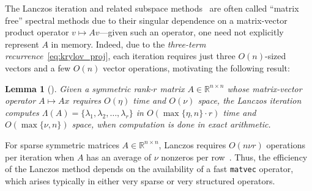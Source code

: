 \documentclass[10pt]{article}
\numberwithin{equation}{section}
\newcommand{\+}{%
	\raisebox{0.18ex}{\scaleobj{0.55}{+}}
}
\newtheorem{corollary}{Corollary}
\newtheorem{lemma}{Lemma}
\theoremstyle{definition}
\theoremstyle{definition}
\begin{document}
 The Lanczos iteration and related subspace methods~\cite{} are often called ``matrix free'' spectral methods due to their singular dependence on a matrix-vector product operator $v \mapsto Av$---given such an operator, one need not explicitly represent $A$ in memory. 
Indeed, due to the \emph{three-term recurrence}~\eqref{eq:krylov_proj}, each iteration requires just three $O(n)$-sized vectors and a few $O(n)$ vector operations, motivating the following result:
\begin{lemma}[\cite{parlett1994we, simon1984analysis}]\label{lemma:exact_arith_lanczos}
	Given a symmetric rank-$r$ matrix $A \in \mathbb{R}^{n \times n}$ whose matrix-vector operator $A \mapsto A x$ requires $O(\eta)$ time and $O(\nu)$ space, the Lanczos iteration computes $\Lambda(A) = \{ \lambda_1, \lambda_2, \dots, \lambda_r \}$ in $O(\max\{\eta, n\}\cdot r)$ time and $O(\max\{\nu, n\})$ space, when computation is done in exact arithmetic. 
\end{lemma}
\noindent For sparse symmetric matrices $A \in \mathbb{R}^{n \times n}$, Lanczos requires $O(n\nu r)$ operations per iteration when $A$ has an average of $\nu$ nonzeros per row~\cite{golub2013matrix}. 
Thus, the efficiency of the Lanczos method depends on the availability of a fast \texttt{matvec} operator, which arises typically in either very sparse or very structured operators.
\end{document}
